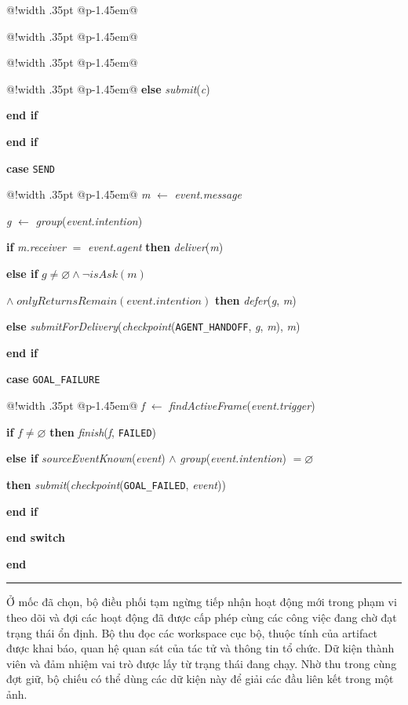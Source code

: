 \documentclass[12pt,a4paper,oneside]{extreport}
\makeatletter
\newenvironment{thesissteps}
  {\par\noindent\begin{tabular}{@{\hspace{.55em}}!{\color{black!50}\vrule width .35pt}%
    @{\hspace{.7em}}p{\dimexpr\linewidth-1.45em\relax}@{}}}
  {\end{tabular}\par}
\makeatother
\begin{document}
\begin{minipage}{\linewidth}
\begin{thesissteps}
\begin{thesissteps}
\begin{thesissteps}
\begin{thesissteps}
\textbf{else} \textit{submit}(\textit{c})\par
\textbf{end if}
\end{thesissteps}
\textbf{end if}
\end{thesissteps}
\textbf{case} \texttt{SEND}\par
\begin{thesissteps}
\textit{m} \(\gets\) \textit{event.message}\par
\textit{g} \(\gets\) \textit{group}(\textit{event.intention})\par
\textbf{if} \textit{m.receiver} \(=\) \textit{event.agent} \textbf{then} \textit{deliver}(\textit{m})\par
\textbf{else if} \(g \ne \varnothing \land \neg\mathit{isAsk}(m)\)\par
\quad \(\land\;\mathit{onlyReturnsRemain}(\mathit{event.intention})\) \textbf{then} \textit{defer}(\textit{g}, \textit{m})\par
\textbf{else} \textit{submitForDelivery}(\textit{checkpoint}(\texttt{AGENT\_HANDOFF}, \textit{g}, \textit{m}), \textit{m})\par
\textbf{end if}
\end{thesissteps}
\textbf{case} \texttt{GOAL\_FAILURE}\par
\begin{thesissteps}
\textit{f} \(\gets\) \textit{findActiveFrame}(\textit{event.trigger})\par
\textbf{if} \(f \ne \varnothing\) \textbf{then} \textit{finish}(\textit{f}, \texttt{FAILED})\par
\textbf{else if} \textit{sourceEventKnown}(\textit{event}) \(\land\) \textit{group}(\textit{event.intention}) \(=\varnothing\)\par
\quad \textbf{then} \textit{submit}(\textit{checkpoint}(\texttt{GOAL\_FAILED}, \textit{event}))\par
\textbf{end if}
\end{thesissteps}
\end{thesissteps}
\textbf{end switch}
\end{thesissteps}
\textbf{end}\par
\smallskip\hrule
\end{minipage}

\smallskip
Ở mốc đã chọn, bộ điều phối tạm ngừng tiếp nhận hoạt động mới trong phạm vi theo dõi và đợi các hoạt động đã được cấp phép cùng các công việc đang chờ đạt trạng thái ổn định. Bộ thu đọc các workspace cục bộ, thuộc tính của artifact được khai báo, quan hệ quan sát của tác tử và thông tin tổ chức. Dữ kiện thành viên và đảm nhiệm vai trò được lấy từ trạng thái đang chạy. Nhờ thu trong cùng đợt giữ, bộ chiếu có thể dùng các dữ kiện này để giải các đầu liên kết trong một ảnh.
\end{document}
